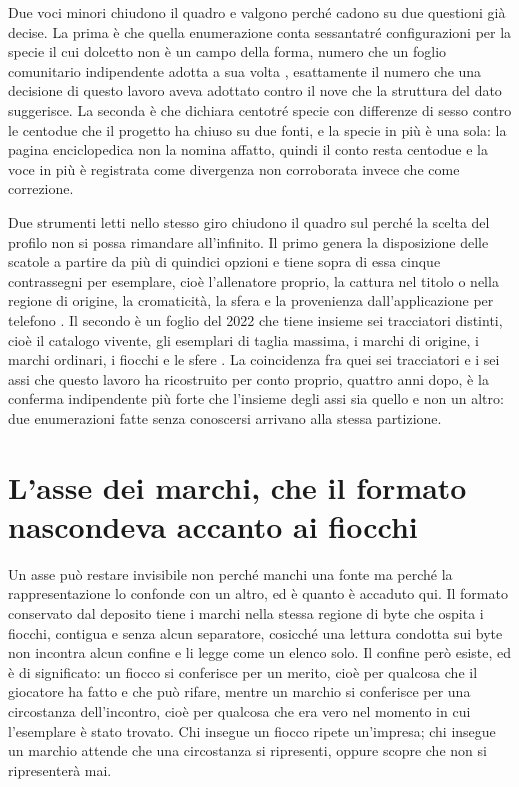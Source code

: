 Due voci minori chiudono il quadro e valgono perché cadono su due questioni già decise. La prima è che quella enumerazione conta sessantatré configurazioni per la specie il cui dolcetto non è un campo della forma, numero che un foglio comunitario indipendente adotta a sua volta \cite{foglio-arca}, esattamente il numero che una decisione di questo lavoro aveva adottato contro il nove che la struttura del dato suggerisce. La seconda è che dichiara centotré specie con differenze di sesso contro le centodue che il progetto ha chiuso su due fonti, e la specie in più è una sola: la pagina enciclopedica non la nomina affatto, quindi il conto resta centodue e la voce in più è registrata come divergenza non corroborata invece che come correzione.

Due strumenti letti nello stesso giro chiudono il quadro sul perché la scelta del profilo non si possa rimandare all'infinito. Il primo genera la disposizione delle scatole a partire da più di quindici opzioni e tiene sopra di essa cinque contrassegni per esemplare, cioè l'allenatore proprio, la cattura nel titolo o nella regione di origine, la cromaticità, la sfera e la provenienza dall'applicazione per telefono \cite{monarium}. Il secondo è un foglio del 2022 che tiene insieme sei tracciatori distinti, cioè il catalogo vivente, gli esemplari di taglia massima, i marchi di origine, i marchi ordinari, i fiocchi e le sfere \cite{foglio-collezione-thundrosaur}. La coincidenza fra quei sei tracciatori e i sei assi che questo lavoro ha ricostruito per conto proprio, quattro anni dopo, è la conferma indipendente più forte che l'insieme degli assi sia quello e non un altro: due enumerazioni fatte senza conoscersi arrivano alla stessa partizione.

\section{L'asse dei marchi, che il formato nascondeva accanto ai fiocchi}

Un asse può restare invisibile non perché manchi una fonte ma perché la rappresentazione lo confonde con un altro, ed è quanto è accaduto qui. Il formato conservato dal deposito tiene i marchi nella stessa regione di byte che ospita i fiocchi, contigua e senza alcun separatore, cosicché una lettura condotta sui byte non incontra alcun confine e li legge come un elenco solo. Il confine però esiste, ed è di significato: un fiocco si conferisce per un merito, cioè per qualcosa che il giocatore ha fatto e che può rifare, mentre un marchio si conferisce per una circostanza dell'incontro, cioè per qualcosa che era vero nel momento in cui l'esemplare è stato trovato. Chi insegue un fiocco ripete un'impresa; chi insegue un marchio attende che una circostanza si ripresenti, oppure scopre che non si ripresenterà mai.

